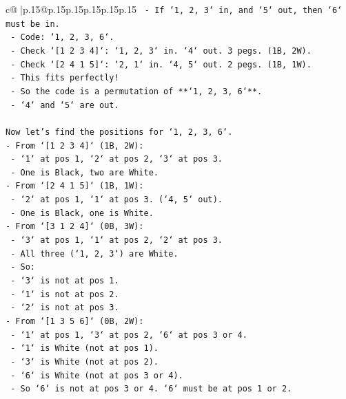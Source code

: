 \documentclass{article}
\begin{document}
{\begin{supertabular}{c@{$\;$}|p{.15\linewidth}@{}p{.15\linewidth}p{.15\linewidth}p{.15\linewidth}p{.15\linewidth}p{.15\linewidth}}
{{{\texttt{        {-} If `1, 2, 3` in, and `5` out, then `6` must be in.} \\
\texttt{        {-} Code: `1, 2, 3, 6`.} \\
\texttt{        {-} Check `{[}1 2 3 4{]}`: `1, 2, 3` in. `4` out. 3 pegs. (1B, 2W).} \\
\texttt{        {-} Check `{[}2 4 1 5{]}`: `2, 1` in. `4, 5` out. 2 pegs. (1B, 1W).} \\
\texttt{        {-} This fits perfectly!} \\
\texttt{        {-} So the code is a permutation of **`1, 2, 3, 6`**.} \\
\texttt{        {-} `4` and `5` are out.} \\
\\ 
\texttt{Now let's find the positions for `1, 2, 3, 6`.} \\
\texttt{{-} From `{[}1 2 3 4{]}` (1B, 2W):} \\
\texttt{    {-} `1` at pos 1, `2` at pos 2, `3` at pos 3.} \\
\texttt{    {-} One is Black, two are White.} \\
\texttt{{-} From `{[}2 4 1 5{]}` (1B, 1W):} \\
\texttt{    {-} `2` at pos 1, `1` at pos 3. (`4, 5` out).} \\
\texttt{    {-} One is Black, one is White.} \\
\texttt{{-} From `{[}3 1 2 4{]}` (0B, 3W):} \\
\texttt{    {-} `3` at pos 1, `1` at pos 2, `2` at pos 3.} \\
\texttt{    {-} All three (`1, 2, 3`) are White.} \\
\texttt{    {-} So:} \\
\texttt{        {-} `3` is not at pos 1.} \\
\texttt{        {-} `1` is not at pos 2.} \\
\texttt{        {-} `2` is not at pos 3.} \\
\texttt{{-} From `{[}1 3 5 6{]}` (0B, 2W):} \\
\texttt{    {-} `1` at pos 1, `3` at pos 2, `6` at pos 3 or 4.} \\
\texttt{    {-} `1` is White (not at pos 1).} \\
\texttt{    {-} `3` is White (not at pos 2).} \\
\texttt{    {-} `6` is White (not at pos 3 or 4).} \\
\texttt{    {-} So `6` is not at pos 3 or 4. `6` must be at pos 1 or 2.} \\
}}}
\end{supertabular}}
\end{document}
